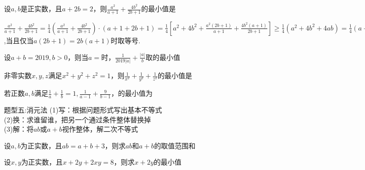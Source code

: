 \par
\begin{problem}
    设$a,b$是正实数，且$a+2b=2$，则$\displaystyle \frac{a^2}{a+1}+\frac{4b^2}{2b+1}$的最小值是
    \begin{jiexi}
        $\displaystyle \frac{a^2}{a+1}+\frac{4b^2}{2b+1}=\frac{1}{4}(\frac{a^2}{a+1}+\frac{4b^2}{2b+1})\cdot(a+1+2b+1)=
        \frac{1}{4}[a^2+4b^2+\frac{a^2(2b+1)}{a+1}+\frac{4b^2(a+1)}{2b+1}]\ge\frac{1}{4}(a^2+4b^2+4ab)=\frac{1}{4}(a+2b)^2=1$,当且仅当$a(2b+1)=2b(a+1)$时取等号.
    \end{jiexi}
\end{problem}

\par
\begin{problem}
    设$a+b=2019,b>0$，则当$a=$时，$\displaystyle \frac{1}{2019|a|}+\frac{|a|}{b}$取的最小值
\end{problem}

\par
\begin{problem}
    非零实数$x,y,z$满足$x^2+y^2+z^2=1$，则$\displaystyle \frac{1}{x^2}+\frac{1}{y^2}+\frac{1}{z^2}$的最小值是
\end{problem}

\par
\begin{problem}
    若正数$a,b$满足$\displaystyle \frac{1}{a}+\frac{1}{b}=1,\frac{1}{a-1}+\frac{9}{b-1}$，的最小值为
\end{problem}



\begin{tcolorbox} 
    \centering
    题型五:消元法
    \tcblower %
    (1)写：根据问题形式写出基本不等式\\
    (2)换：求谁留谁，把另一个通过条件整体替换掉\\
    (3)解：将$ab$或$a+b$视作整体，解二次不等式
\end{tcolorbox}

\par
\begin{problem}
    设$a,b$为正实数，且$ab=a+b+3$，则求$ab$和$a+b$的取值范围\tiankong{$[9,+\infty)$}和\tiankong{$[6,+\infty)$}
\end{problem}

\par
\begin{problem}
    设$x,y$为正实数，且$x+2y+2xy=8$，则求$x+2y$的最小值
\end{problem}


